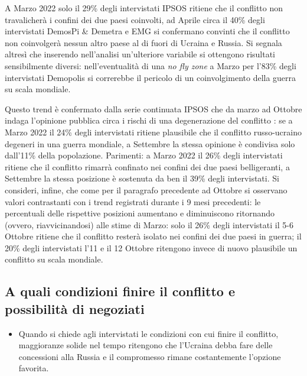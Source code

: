 \documentclass[
]{book}
\providecommand{\tightlist}{%
  \setlength{\itemsep}{0pt}\setlength{\parskip}{0pt}}
\begin{document}
A Marzo 2022 solo il 29\% degli intervistati IPSOS ritiene che il conflitto non travalicherà i confini dei due paesi coinvolti, ad Aprile circa il 40\% degli intervistati DemosPi \& Demetra e EMG si confermano convinti che il conflitto non coinvolgerà nessun altro paese al di fuori di Ucraina e Russia.
Si segnala altresì che inserendo nell'analisi un'ulteriore variabile si ottengono risultati sensibilmente diversi: nell'eventualità di una \emph{no fly zone} a Marzo per l'83\% degli intervistati Demopolis si correrebbe il pericolo di un coinvolgimento della guerra su scala mondiale.

Questo trend è confermato dalla serie continuata IPSOS che da marzo ad Ottobre indaga l'opinione pubblica circa i rischi di una degenerazione del conflitto : se a Marzo 2022 il 24\% degli intervistati ritiene plausibile che il conflitto russo-ucraino degeneri in una guerra mondiale, a Settembre la stessa opinione è condivisa solo dall'11\% della popolazione.
Parimenti: a Marzo 2022 il 26\% degli intervistati ritiene che il conflitto rimarrà confinato nei confini dei due paesi belligeranti, a Settembre la stessa posizione è sostenuta da ben il 39\% degli intervistati. Si consideri, infine, che come per il paragrafo precedente ad Ottobre si osservano valori contrastanti con i trend registrati durante i 9 mesi precedenti: le percentuali delle rispettive posizioni aumentano e diminuiscono ritornando (ovvero, riavvicinandosi) alle stime di Marzo: solo il 26\% degli intervistati il 5-6 Ottobre ritiene che il conflitto resterà isolato nei confini dei due paesi in guerra; il 20\% degli intervistati l'11 e il 12 Ottobre ritengono invece di nuovo plausibile un conflitto su scala mondiale.

\hypertarget{a-quali-condizioni-finire-il-conflitto-e-possibilituxe0-di-negoziati}{%
\subsection{A quali condizioni finire il conflitto e possibilità di negoziati}\label{a-quali-condizioni-finire-il-conflitto-e-possibilituxe0-di-negoziati}}

\begin{itemize}
\tightlist
\item
  Quando si chiede agli intervistati le condizioni con cui finire il conflitto, maggioranze solide nel tempo ritengono che l'Ucraina debba fare delle concessioni alla Russia e il compromesso rimane costantemente l'opzione favorita.
\end{itemize}
\end{document}
